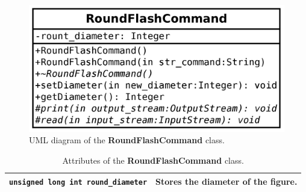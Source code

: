 \documentclass[11pt,twoside,openany,x11names,svgnames]{memoir}
\begin{document}
\begin{figure}
	\centering
	\includegraphics[scale=0.2, clip=true, trim= 0pt 0pt 0pt 0pt]{images/chapter03-image23}
	\caption{UML diagram of the \textbf{RoundFlashCommand} class.}
	\label{fig:class-roundflash-command}
\end{figure}

\begin{table}[h]\footnotesize
\centering
\begin{tabular}{| >{\bfseries}p{6.5cm} | p{9cm} |}
	\hline
	
	\texttt{unsigned long int round\_diameter} & Stores the diameter of the figure. \\
	
	\hline
\end{tabular}
\caption{Attributes of the \textbf{RoundFlashCommand} class.}
\label{tab:RoundFlashCommand-Attributes}
\end{table}
\end{document}
